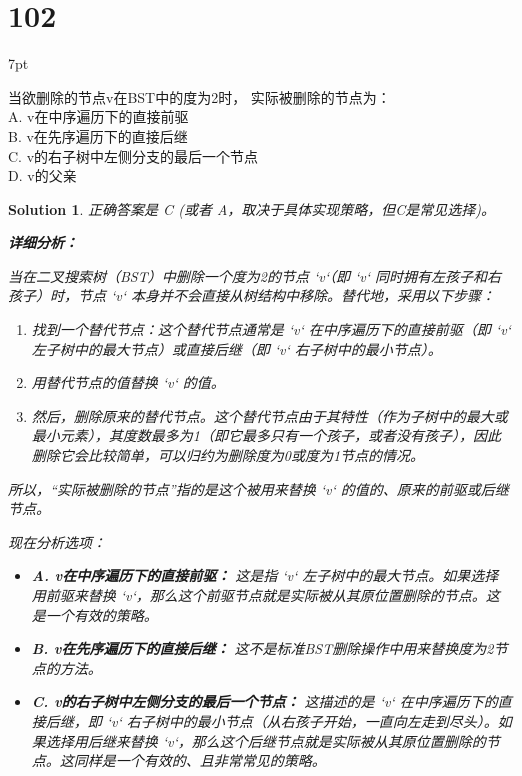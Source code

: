 \documentclass[UTF8]{report}
\newtheorem{solution}{Solution}
\theoremstyle{MyLineTheoremStyle} %
\theoremstyle{MyBlockTheoremStyle} %
\theoremstyle{MySubsubsectionStyle} %
\newenvironment{graybox}{%
        \def\FrameCommand{%
        \hspace{1pt}%
        {\color{gray}\small \vrule width 2pt}%
        {\color{graybox_color}\vrule width 4pt}%
        \colorbox{graybox_color}%
        }%
        \MakeFramed{\advance\hsize-\width\FrameRestore}%
        \noindent\hspace{-4.55pt}%
        \begin{adjustwidth}{}{7pt}%
        \vspace{2pt}\vspace{2pt}%
        }
        {%
        \vspace{2pt}\end{adjustwidth}\endMakeFramed%
        }
\begin{document}
\section*{102}
\begin{graybox}
当欲删除的节点v在BST中的度为2时，
实际被删除的节点为： \\
A. v在中序遍历下的直接前驱 \\
B. v在先序遍历下的直接后继 \\
C. v的右子树中左侧分支的最后一个节点 \\
D. v的父亲
\end{graybox}

\begin{solution}
正确答案是 C (或者 A，取决于具体实现策略，但C是常见选择)。

\textbf{详细分析：}

当在二叉搜索树（BST）中删除一个度为2的节点 `v`（即 `v` 同时拥有左孩子和右孩子）时，节点 `v` 本身并不会直接从树结构中移除。替代地，采用以下步骤：
\begin{enumerate}
    \item 找到一个替代节点：这个替代节点通常是 `v` 在中序遍历下的直接前驱（即 `v` 左子树中的最大节点）或直接后继（即 `v` 右子树中的最小节点）。
    \item 用替代节点的值替换 `v` 的值。
    \item 然后，删除原来的替代节点。这个替代节点由于其特性（作为子树中的最大或最小元素），其度数最多为1（即它最多只有一个孩子，或者没有孩子），因此删除它会比较简单，可以归约为删除度为0或度为1节点的情况。
\end{enumerate}
所以，“实际被删除的节点”指的是这个被用来替换 `v` 的值的、原来的前驱或后继节点。

现在分析选项：
\begin{itemize}
    \item \textbf{A. v在中序遍历下的直接前驱：}
        这是指 `v` 左子树中的最大节点。如果选择用前驱来替换 `v`，那么这个前驱节点就是实际被从其原位置删除的节点。这是一个有效的策略。

    \item \textbf{B. v在先序遍历下的直接后继：}
        这不是标准BST删除操作中用来替换度为2节点的方法。

    \item \textbf{C. v的右子树中左侧分支的最后一个节点：}
        这描述的是 `v` 在中序遍历下的直接后继，即 `v` 右子树中的最小节点（从右孩子开始，一直向左走到尽头）。如果选择用后继来替换 `v`，那么这个后继节点就是实际被从其原位置删除的节点。这同样是一个有效的、且非常常见的策略。


\end{itemize}
\end{solution}
\end{document}
